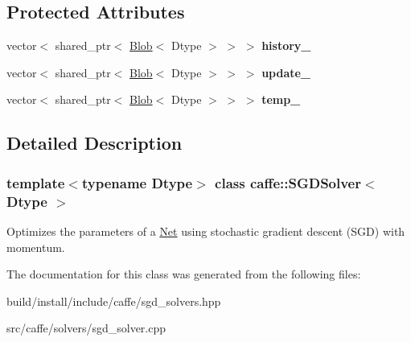 \subsection*{Protected Attributes}
\begin{DoxyCompactItemize}
\item 
\mbox{\label{classcaffe_1_1_s_g_d_solver_aa3f82c98886dd458a7dd9c6f7a04a1d7}} 
vector$<$ shared\+\_\+ptr$<$ \mbox{\hyperlink{classcaffe_1_1_blob}{Blob}}$<$ Dtype $>$ $>$ $>$ {\bfseries history\+\_\+}
\item 
\mbox{\label{classcaffe_1_1_s_g_d_solver_a0e30874bdb7c07494c44c8bdd8546221}} 
vector$<$ shared\+\_\+ptr$<$ \mbox{\hyperlink{classcaffe_1_1_blob}{Blob}}$<$ Dtype $>$ $>$ $>$ {\bfseries update\+\_\+}
\item 
\mbox{\label{classcaffe_1_1_s_g_d_solver_a399c19319fff236379e12fe9ad031b37}} 
vector$<$ shared\+\_\+ptr$<$ \mbox{\hyperlink{classcaffe_1_1_blob}{Blob}}$<$ Dtype $>$ $>$ $>$ {\bfseries temp\+\_\+}
\end{DoxyCompactItemize}


\subsection{Detailed Description}
\subsubsection*{template$<$typename Dtype$>$\newline
class caffe\+::\+S\+G\+D\+Solver$<$ Dtype $>$}

Optimizes the parameters of a \mbox{\hyperlink{classcaffe_1_1_net}{Net}} using stochastic gradient descent (S\+GD) with momentum. 

The documentation for this class was generated from the following files\+:\begin{DoxyCompactItemize}
\item 
build/install/include/caffe/sgd\+\_\+solvers.\+hpp\item 
src/caffe/solvers/sgd\+\_\+solver.\+cpp\end{DoxyCompactItemize}
